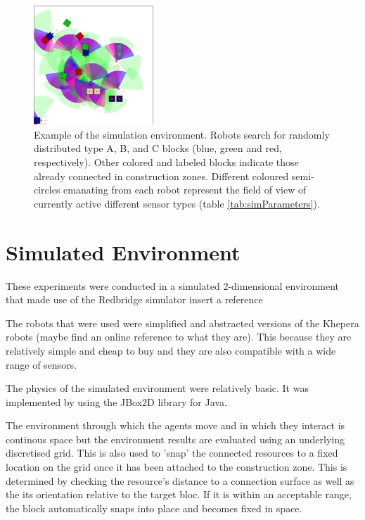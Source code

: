 \begin{figure}[t]
	\centering
	\includegraphics[width=0.40\textwidth]{Figures/TaskEnv.eps}
\caption{Example of the simulation environment.  Robots search for randomly distributed
type A, B, and C blocks (blue, green and red, respectively).  Other colored and labeled
blocks indicate those already connected in construction zones.
Different coloured semi-circles emanating from each
robot represent the field of view of currently active different sensor types (table \ref{tab:simParameters}).}\label{fig:taskEnv}
\end{figure}




\section{Simulated Environment}

These experiments were conducted in a simulated 2-dimensional environment that made use of the Redbridge simulator {insert a reference}

The robots that were used were simplified and abstracted versions of the Khepera robots (maybe find an online reference to what they are). This because they are relatively simple and cheap to buy and they are also compatible with a wide range of sensors.

The physics of the simulated environment were relatively basic. It was implemented by using the JBox2D library for Java.

The environment through which the agents move and in which they interact is continous space but the environment results are evaluated using an underlying discretised grid. This is also used to 'snap' the connected resources to a fixed location on the grid once it has been attached to the construction zone. This is determined by checking the resource's distance to a connection surface as well as the its orientation relative to the target bloc. If it is within an acceptable range, the block automatically snaps into place and becomes fixed in space.

